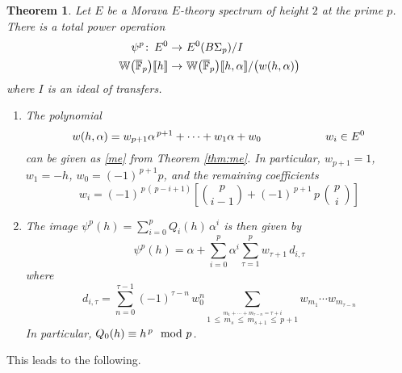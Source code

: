 \documentclass{gtpart}
\newtheorem{thm}[equation]{Theorem}
\theoremstyle{definition}
\theoremstyle{remark}
\def\co{\colon\thinspace}
\newcommand{\mb}[1]{\mathbb{#1}}
\newcommand{\cF}{\overline {\mb F}}
\newcommand{\BW}{{\mb W}}
\newcommand{\md}{~~{\rm mod}~}
\newcommand{\A}{\alpha}
\newcommand{\T}{\tau}
\newcommand{\lb}{\llbracket}
\newcommand{\rb}{\rrbracket}
\renewcommand{\=}{\approx}
\renewcommand{\-}{\sim}
\newcommand{\ch}[2]{{#1 \choose #2}}
\numberwithin{equation}{section}
\begin{document}
\begin{thm}
 \label{thm:po}
 Let $E$ be a Morava $E$-theory spectrum of height $2$ at the prime $p$.  There 
 is a total power operation 
 \[
  \begin{split}
                \psi^p \co E^0 \to & ~ E^0(B\Sigma_p) / I \\
   \BW\big(\cF_p\big)\lb h \rb \to & ~ \BW\big(\cF_p\big)\lb h,\A \rb 
                                       / \big( w(h,\A) \big) 
  \end{split}
 \]
 where $I$ is an ideal of transfers.  

 \begin{enumerate}[{\em (i)}]
  \item The polynomial 
  \[
   w(h,\A) = w_{p + 1} \A^{\,p + 1} + \cdots + w_1 \A + w_0 
   \hskip 2cm w_i \in E^0 
  \]
  can be given as \eqref{me} from Theorem \ref{thm:me}.  In particular, 
  $w_{p + 1} = 1$, $w_1 = -h$, $w_0 = (-1)^{\,p + 1} p$, and the remaining 
  coefficients 
  \[
   w_i = (-1)^{\,p\,(\,p - i + 1)} \left[ \ch{p}{i - 1} 
         + (-1)^{\,p + 1} \, p \, \ch{\,p\,}{i} \right] 
  \]

  \item The image $\psi^p(h) = \sum_{i = 0}^p Q_i(h) \, \A^i$ is then given by 
  \[
   \psi^p(h) = \A + \sum_{i = 0}^p \A^i \sum_{\T = 1}^p w_{\T + 1} \, d_{i,\T} 
  \]
  where 
  \[
   d_{i,\T} = \sum_{n = 0}^{\T - 1} (-1)^{\T - n} \, w_0^n 
              \sum_{\stackrel{\scriptstyle m_1 + \cdots + m_{\T - n} = \T + i} 
              {1 \,\leq\, m_s \,\leq\, m_{s + 1} \,\leq\, p + 1}} w_{m_1} \cdots 
              w_{m_{\T - n}} 
  \]
  In particular, $Q_0(h) \equiv h^{\,p} \md p$.  
 \end{enumerate}
\end{thm}

This leads to the following.  
\end{document}
